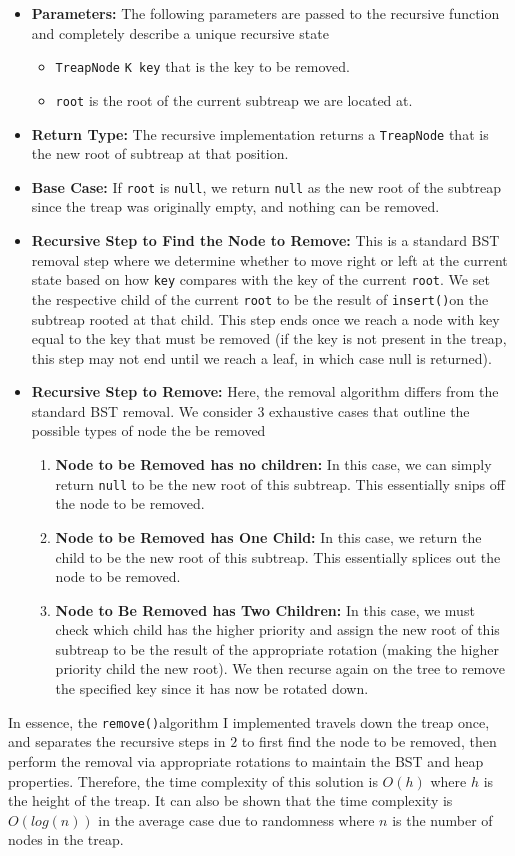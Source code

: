 \documentclass[11pt]{article}
\def\tt{\texttt}
\def\ins{\tt{insert()}}
\def\rem{\tt{remove()}}
\def\tn{\tt{TreapNode}}
\begin{document}
\begin{itemize}
	\item \textbf{Parameters: } The following parameters are passed to the recursive function and completely describe a unique recursive state
	\begin{itemize}
		\item \tn{} \tt{K key} that is the key to be removed.
		\item \tt{root} is the root of the current subtreap we are located at. 
	\end{itemize}
	\item \textbf{Return Type: } The recursive implementation returns a \tn{} that is the new root of subtreap at that position.
	\item \textbf{Base Case: } If \tt{root} is \tt{null}, we return \tt{null} as the new root of the subtreap since the treap was originally empty, and nothing can be removed. 
	\item \textbf{Recursive Step to Find the Node to Remove: } This is a standard BST removal step where we determine whether to move right or left at the current state based on how \tt{key} compares with the key of the current \tt{root}. We set the respective child of the current \tt{root} to be the result of \ins on the subtreap rooted at that child. This step ends once we reach a node with key equal to the key that must be removed (if the key is not present in the treap, this step may not end until we reach a leaf, in which case null is returned).
	\item \textbf{Recursive Step to Remove: } Here, the removal algorithm differs from the standard BST removal. We consider $3$ exhaustive cases that outline the possible types of node the be removed
	\begin{enumerate}
		\item \textbf{Node to be Removed has no children: }In this case, we can simply return \tt{null} to be the new root of this subtreap. This essentially snips off the node to be removed.
		\item \textbf{Node to be Removed has One Child: } In this case, we return the child to be the new root of this subtreap. This essentially splices out the node to be removed.
		\item \textbf{Node to Be Removed has Two Children: } In this case, we must check which child has the higher priority and assign the new root of this subtreap to be the result of the appropriate rotation (making the higher priority child the new root). We then recurse again on the tree to remove the specified key since it has now be rotated down.
	\end{enumerate}
\end{itemize}
In essence, the \rem algorithm I implemented travels down the treap once, and separates the recursive steps in $2$ to first find the node to be removed, then perform the removal via appropriate rotations to maintain the BST and heap properties. Therefore, the time complexity of this solution is $O(h)$ where $h$ is the height of the treap. It can also be shown that the time complexity is $O(log(n))$ in the average case due to randomness where $n$ is the number of nodes in the treap.
\end{document}
